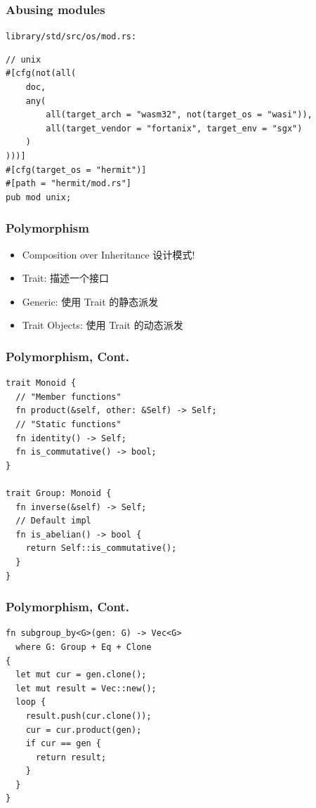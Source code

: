 \documentclass[UTF-8]{ctexbeamer}
\begin{document}
\begin{frame}[fragile]
  \frametitle{Abusing modules}

  \texttt{library/std/src/os/mod.rs:}

  \begin{verbatim}
// unix
#[cfg(not(all(
    doc,
    any(
        all(target_arch = "wasm32", not(target_os = "wasi")),
        all(target_vendor = "fortanix", target_env = "sgx")
    )
)))]
#[cfg(target_os = "hermit")]
#[path = "hermit/mod.rs"]
pub mod unix;
  \end{verbatim}
\end{frame}

\begin{frame}
  \frametitle{Polymorphism}

  \begin{itemize}
    \item Composition over Inheritance {\tiny{设计模式!}}
    \item Trait: 描述一个接口
    \pause
    \item Generic: 使用 Trait 的静态派发
    \item Trait Objects: 使用 Trait 的动态派发
  \end{itemize}
\end{frame}

\begin{frame}[fragile]
  \frametitle{Polymorphism, Cont.}
  \begin{verbatim}
trait Monoid {
  // "Member functions"
  fn product(&self, other: &Self) -> Self;
  // "Static functions"
  fn identity() -> Self;
  fn is_commutative() -> bool;
}

trait Group: Monoid {
  fn inverse(&self) -> Self;
  // Default impl
  fn is_abelian() -> bool {
    return Self::is_commutative();
  }
}
  \end{verbatim}
\end{frame}

\begin{frame}[fragile]
  \frametitle{Polymorphism, Cont.}

  \begin{verbatim}
fn subgroup_by<G>(gen: G) -> Vec<G>
  where G: Group + Eq + Clone
{
  let mut cur = gen.clone();
  let mut result = Vec::new();
  loop {
    result.push(cur.clone());
    cur = cur.product(gen);
    if cur == gen {
      return result;
    }
  }
}
  \end{verbatim}
\end{frame}
\end{document}
